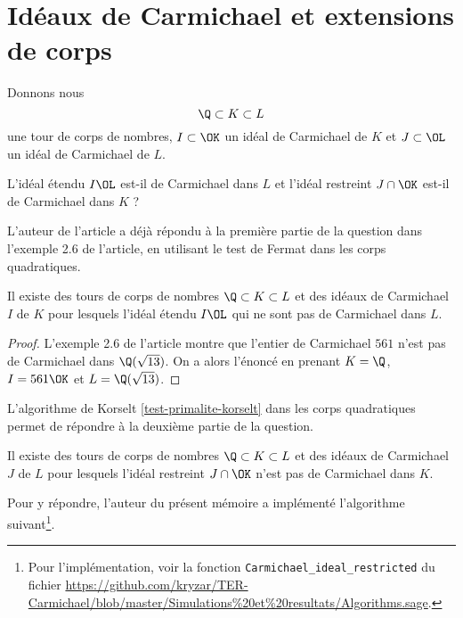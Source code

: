 \section{Idéaux de Carmichael et extensions de corps}

Donnons nous \[\Q\subset K \subset L\] une tour de corps de nombres, $I\subset \OK$ un idéal de Carmichael de $K$ et $J \subset \OL$ un idéal de Carmichael de $L$. 

\begin{question}
	L'idéal étendu $I\OL$ est-il de Carmichael dans $L$ et l'idéal restreint $J\cap\OK$ est-il de Carmichael dans $K$ ? 
\end{question}

L'auteur de l'article a déjà répondu à la première partie de la question dans l'exemple 2.6 de l'article, en utilisant le test de Fermat dans les corps quadratiques.

\begin{proposition}\label{premier-ce}
	Il existe des tours de corps de nombres $\Q\subset K \subset L$ et des idéaux de Carmichael $I$ de $K$ pour lesquels l'idéal étendu $I\OL$ qui ne sont pas de Carmichael dans $L$.
\end{proposition}

\begin{proof}
	L'exemple 2.6 de l'article montre que l'entier de Carmichael $561$ n'est pas de Carmichael dans $\Q(\sqrt{13})$. On a alors l'énoncé en prenant $K = \Q$, $I = 561\OK$ et $L = \Q(\sqrt{13})$.
\end{proof}

L'algorithme de Korselt \ref{test-primalite-korselt} dans les corps quadratiques permet de répondre à la deuxième partie de la question. 

\begin{proposition}\label{deuxieme-ce}
	Il existe des tours de corps de nombres $\Q\subset K \subset L$ et des idéaux de Carmichael $J$ de $L$ pour lesquels l'idéal restreint $J\cap \OK$ n'est pas de Carmichael dans $K$.
\end{proposition}

Pour y répondre, l'auteur du présent mémoire a implémenté l'algorithme suivant\footnote{Pour l'implémentation, voir la fonction \texttt{Carmichael\_ideal\_restricted} du fichier \url{https://github.com/kryzar/TER-Carmichael/blob/master/Simulations\%20et\%20resultats/Algorithms.sage}.}.

